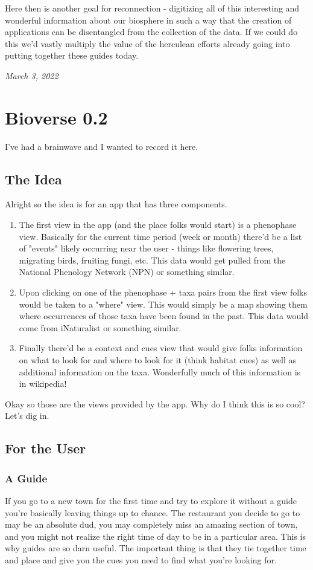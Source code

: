 \documentclass[10pt,a5paper]{book}
\begin{document}
Here then is another goal for reconnection - digitizing all of this interesting and wonderful information about our biosphere in such a way that the creation of applications can be disentangled from the collection of the data. If we could do this we'd vastly multiply the value of the herculean efforts already going into putting together these guides today. 

\textit{March 3, 2022}

\section{Bioverse 0.2}
I've had a brainwave and I wanted to record it here.

\subsection{The Idea}
Alright so the idea is for an app that has three components.
\begin{enumerate}
\item The first view in the app (and the place folks would start) is a phenophase view. Basically for the current time period (week or month) there'd be a list of "events" likely occurring near the user - things like flowering trees, migrating birds, fruiting fungi, etc. This data would get pulled from the National Phenology Network (NPN) or something similar.
\item Upon clicking on one of the phenophase + taxa pairs from the first view folks would be taken to a "where" view. This would simply be a map showing them where occurrences of those taxa have been found in the past. This data would come from iNaturalist or something similar. 
\item Finally there'd be a context and cues view that would give folks information on what to look for and where to look for it (think habitat cues) as well as additional information on the taxa. Wonderfully much of this information is in wikipedia!
\end{enumerate}

Okay so those are the views provided by the app. Why do I think this is so cool? Let's dig in.

\subsection{For the User}
\subsubsection{A Guide}
If you go to a new town for the first time and try to explore it without a guide you're basically leaving things up to chance. The restaurant you decide to go to may be an absolute dud, you may completely miss an amazing section of town, and you might not realize the right time of day to be in a particular area. This is why guides are so darn useful. The important thing is that they tie together time and place and give you the cues you need to find what you're looking for. 
\end{document}
